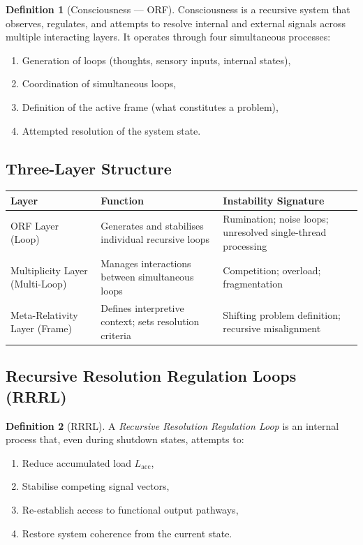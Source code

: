 \documentclass[12pt,a4paper]{article}
\theoremstyle{definition}
\newtheorem{definition}{Definition}[section]
\begin{document}
\begin{definition}[Consciousness — ORF]\label{def:consciousness}
  Consciousness is a recursive system that observes, regulates, and
  attempts to resolve internal and external signals across multiple
  interacting layers.  It operates through four simultaneous processes:
  \begin{enumerate}[label=\alph*.]
    \item Generation of loops (thoughts, sensory inputs, internal states),
    \item Coordination of simultaneous loops,
    \item Definition of the active frame (what constitutes a problem),
    \item Attempted resolution of the system state.
  \end{enumerate}
\end{definition}

\subsection{Three-Layer Structure}

\begin{longtable}{@{}p{4cm}p{4.5cm}p{5cm}@{}}
  \toprule
  \textbf{Layer} & \textbf{Function} & \textbf{Instability Signature} \\
  \midrule
  ORF Layer (Loop) & Generates and stabilises individual recursive loops &
    Rumination; noise loops; unresolved single-thread processing \\
  Multiplicity Layer (Multi-Loop) & Manages interactions between simultaneous
    loops & Competition; overload; fragmentation \\
  Meta-Relativity Layer (Frame) & Defines interpretive context; sets
    resolution criteria & Shifting problem definition;
    recursive misalignment \\
  \bottomrule
\end{longtable}

\subsection{Recursive Resolution Regulation Loops (RRRL)}

\begin{definition}[RRRL]
  A \emph{Recursive Resolution Regulation Loop} is an internal process
  that, even during shutdown states, attempts to:
  \begin{enumerate}[label=\arabic*.]
    \item Reduce accumulated load $L_\mathrm{acc}$,
    \item Stabilise competing signal vectors,
    \item Re-establish access to functional output pathways,
    \item Restore system coherence from the current state.
  \end{enumerate}
\end{definition}
\end{document}
